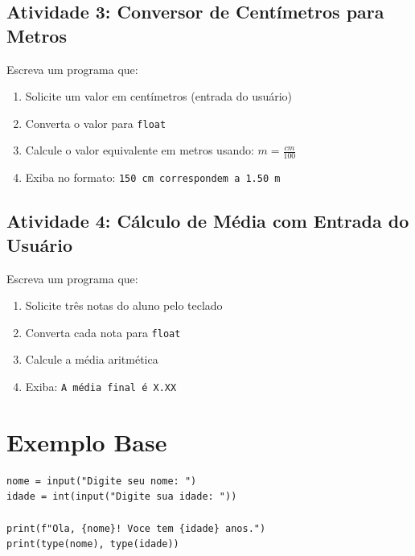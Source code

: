 \documentclass[12pt]{article}
\begin{document}
\subsection*{Atividade 3: Conversor de Centímetros para Metros}
Escreva um programa que:
\begin{enumerate}
    \item Solicite um valor em centímetros (entrada do usuário)
    \item Converta o valor para \texttt{float}
    \item Calcule o valor equivalente em metros usando: $m = \frac{cm}{100}$
    \item Exiba no formato: \texttt{150 cm correspondem a 1.50 m}
\end{enumerate}

\subsection*{Atividade 4: Cálculo de Média com Entrada do Usuário}
Escreva um programa que:
\begin{enumerate}
    \item Solicite três notas do aluno pelo teclado
    \item Converta cada nota para \texttt{float}
    \item Calcule a média aritmética
    \item Exiba: \texttt{A média final é X.XX}
\end{enumerate}

\section*{Exemplo Base}
\begin{lstlisting}
nome = input("Digite seu nome: ")
idade = int(input("Digite sua idade: "))

print(f"Ola, {nome}! Voce tem {idade} anos.")
print(type(nome), type(idade))
\end{lstlisting}
\end{document}
